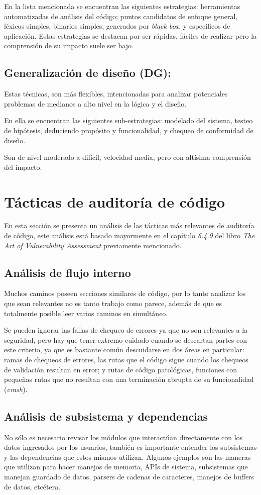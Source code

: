 En la lista mencionada se encuentran las siguientes estrategias: herramientas automatizadas de análisis del código; puntos candidatos de enfoque general, léxicos simples, binarios simples, generados por \textit{black box}, y específicos de aplicación. Estas estrategias se destacan por ser rápidas, fáciles de realizar pero la comprensión de su impacto suele ser bajo.

\subsection{Generalización de diseño (DG):}
Estas técnicas, son más flexibles, intencionadas para analizar potenciales problemas de medianos a alto nivel en la lógica y el diseño.

En ella se encuentran las siguientes sub-estrategias: modelado del sistema, testeo de hipótesis, deduciendo propósito y funcionalidad, y chequeo de conformidad de diseño.

Son de nivel moderado a difícil, velocidad media, pero con altísima comprensión del impacto.

\section{Tácticas de auditoría de código}
En esta sección se presenta un análisis de las tácticas más relevantes de auditoría de código, este análisis está basado mayormente en el capítulo \textit{6.4.9} del libro \textit{The Art of Vulnerability Assessment} previamente mencionado.

\subsection{Análisis de flujo interno}
Muchos caminos poseen secciones similares de código, por lo tanto analizar los que sean relevantes no es tanto trabajo como parece, además de que es totalmente posible leer varios caminos en simultáneo.

Se pueden ignorar las fallas de chequeo de errores ya que no son relevantes a la seguridad, pero hay que tener extremo cuidado cuando se descartan partes con este criterio, ya que es bastante común descuidarse en dos áreas en particular: ramas de chequeos de errores, las rutas que el código sigue cuando los chequeos de validación resultan en error; y rutas de código patológicas, funciones con pequeñas rutas que no resultan con una terminación abrupta de su funcionalidad (\textit{crash}).

\subsection{Análisis de subsistema y dependencias}
No sólo es necesario revisar los módulos que interactúan directamente con los datos ingresados por los usuarios, también es importante entender los subsistemas y las dependencias que estos mismos utilizan. Algunos ejemplos son las maneras que utilizan para hacer manejos de memoria, APIs de sistema, subsistemas que manejan guardado de datos, parsers de cadenas de caracteres, manejos de buffers de datos, etcétera.


